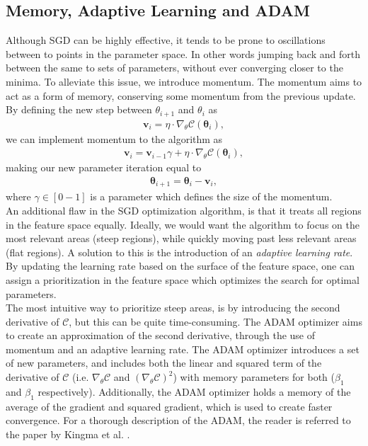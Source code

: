 \subsection{Memory, Adaptive Learning and ADAM}\label{subsec:ADAM}
Although \ac{SGD} can be highly effective, it tends to be prone to oscillations between to points in the parameter space. In other words jumping back and forth between 
the same to sets of parameters, without ever converging closer to the minima. To alleviate this issue, we introduce momentum. The momentum aims to act as a form of 
memory, conserving some momentum from the previous update. By defining the new step between $\theta_{i+1}$ and $\theta_{i}$ as 
\begin{align}
    \textbf{v}_i = \eta \cdot \nabla_\theta \mathcal{C}\left(\boldsymbol{\theta}_i\right),
\end{align}
we can implement momentum to the algorithm as 
\begin{align}
    \textbf{v}_i = \textbf{v}_{i-1} \gamma +\eta \cdot \nabla_\theta \mathcal{C}\left(\boldsymbol{\theta}_i\right),
\end{align}
making our new parameter iteration equal to
\begin{align}
    \boldsymbol{\theta}_{i+1}=\boldsymbol{\theta}_i-\textbf{v}_i,
\end{align}
where $\gamma \in [0-1]$ is a parameter which defines the size of the momentum.
\\
An additional flaw in the \ac{SGD} optimization algorithm, is that it treats all regions in the feature space equally. Ideally, we would want the algorithm to focus 
on the most relevant areas (steep regions), while quickly moving past less relevant areas (flat regions). A solution to this is the introduction of an \emph{adaptive learning rate}.
By updating the learning rate based on the surface of the feature space, one can assign a prioritization in the feature space which optimizes the search for optimal parameters.
\\
The most intuitive way to prioritize steep areas, is by introducing the second derivative of $\mathcal{C}$, but this can be quite time-consuming. The \ac{ADAM} optimizer aims to 
create an approximation of the second derivative, through the use of momentum and an adaptive learning rate. The \ac{ADAM} optimizer introduces a set of new parameters, and includes both the 
linear and squared term of the derivative of $\mathcal{C}$ (i.e. $\nabla_\theta \mathcal{C}$ and $(\nabla_\theta \mathcal{C})^2$) with memory parameters for both ($\beta_1$ and $\beta_1$ respectively). Additionally, the \ac{ADAM} optimizer holds a memory of the average of the 
gradient and squared gradient, which is used to create faster convergence. For a thorough description of the \ac{ADAM}, the reader is referred to the paper by Kingma et al.  \cite{kingma_adam_2017}.
